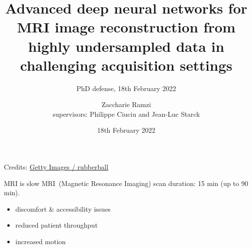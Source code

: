 \documentclass[aspectratio=169,xcolor=dvipsnames]{beamer}
\title[Advanced deep neural networks for MRI image reconstruction]{Advanced deep neural networks for MRI image reconstruction from highly undersampled data in challenging acquisition settings
} %
\subtitle{PhD defense, 18th February 2022}
\author[Zaccharie] {Zaccharie Ramzi \\  {\footnotesize supervisors: Philippe Ciuciu and Jean-Luc Starck}}
\institute[Inria-CEA] %
{
    Parietal team, Inria Saclay \\
    NeuroSpin and Cosmostat, CEA Saclay
}
\date{18th February 2022} %
\begin{document}
\begin{frame}
    \titlepage
\end{frame}

{
\begin{frame}[plain]
    \href{run:Sounds/mri_sounds.mp3}{\faPlayCircle}
    \begin{minipage}[t][.8\textheight]{\textwidth}
        \vfill

        \tiny
        Credits: \href{https://www.francetvinfo.fr/sante/malgre-l-augmentation-des-besoins-medicaux-le-deficit-en-france-d-appareils-irm-se-fait-de-plus-en-plus-sentir_220301.html}{Getty Images / rubberball}
      \end{minipage}
\end{frame}
}

\begin{frame}{MRI is slow}
    MRI~(Magnetic Resonance Imaging) scan duration: 15 min (up to 90 min).
    \begin{itemize}
        \item discomfort \& accessibility issues
        \item reduced patient throughput
        \item increased motion
    \end{itemize}
\end{frame}
\end{document}
